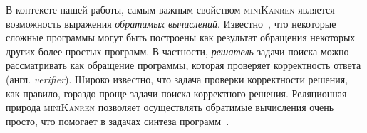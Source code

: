 
В контексте нашей работы, самым важным свойством \textsc{miniKanren} является возможность выражения \emph{обратимых вычислений}.
Известно~\cite{SemanticsModifiers,SemanticsModifiers1}, что некоторые сложные программы могут быть построены как результат обращения некоторых других более простых программ. В частности, \emph{решатель} задачи поиска можно рассматривать как обращение программы, которая проверяет корректность ответа (англ. \emph{verifier}).
Широко известно, что задача проверки корректности решения, как правило, гораздо проще задачи поиска корректного решения.
Реляционная природа \textsc{miniKanren} позволяет осуществлять обратимые вычисления очень просто, что помогает в задачах синтеза программ~\cite{Untagged,WBirdSeven,PatternMatching}.



